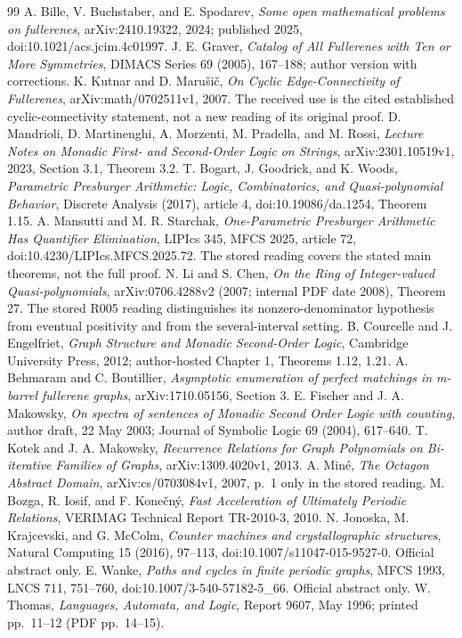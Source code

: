 \documentclass[11pt]{amsart}
\theoremstyle{definition}\newtheorem{definition}{Definition}
\begin{document}
\clearpage
\begin{thebibliography}{99}
 A. Bille, V. Buchstaber, and E. Spodarev,
\emph{Some open mathematical problems on fullerenes}, arXiv:2410.19322,
2024; published 2025, doi:10.1021/acs.jcim.4c01997.
 J. E. Graver,
\emph{Catalog of All Fullerenes with Ten or More Symmetries},
DIMACS Series 69 (2005), 167--188; author version with corrections.
 K. Kutnar and D. Maru\v{s}i\v{c},
\emph{On Cyclic Edge-Connectivity of Fullerenes}, arXiv:math/0702511v1,
2007. The received use is the cited established cyclic-connectivity
statement, not a new reading of its original proof.
 D. Mandrioli, D. Martinenghi, A. Morzenti,
M. Pradella, and M. Rossi,
\emph{Lecture Notes on Monadic First- and Second-Order Logic on Strings},
arXiv:2301.10519v1, 2023, Section 3.1, Theorem 3.2.
 T. Bogart, J. Goodrick, and K. Woods,
\emph{Parametric Presburger Arithmetic: Logic, Combinatorics, and
Quasi-polynomial Behavior}, Discrete Analysis (2017), article 4,
doi:10.19086/da.1254, Theorem 1.15.
 A. Mansutti and M. R. Starchak,
\emph{One-Parametric Presburger Arithmetic Has Quantifier Elimination},
LIPIcs 345, MFCS 2025, article 72, doi:10.4230/LIPIcs.MFCS.2025.72.
The stored reading covers the stated main theorems, not the full proof.
 N. Li and S. Chen,
\emph{On the Ring of Integer-valued Quasi-polynomials},
arXiv:0706.4288v2 (2007; internal PDF date 2008), Theorem 27.
The stored R005 reading distinguishes its nonzero-denominator hypothesis
from eventual positivity and from the several-interval setting.
 B. Courcelle and J. Engelfriet,
\emph{Graph Structure and Monadic Second-Order Logic}, Cambridge
University Press, 2012; author-hosted Chapter 1, Theorems 1.12, 1.21.
 A. Behmaram and C. Boutillier,
\emph{Asymptotic enumeration of perfect matchings in m-barrel fullerene graphs},
arXiv:1710.05156, Section 3.
 E. Fischer and J. A. Makowsky,
\emph{On spectra of sentences of Monadic Second Order Logic with counting},
author draft, 22 May 2003; Journal of Symbolic Logic 69 (2004), 617--640.
 T. Kotek and J. A. Makowsky,
\emph{Recurrence Relations for Graph Polynomials on Bi-iterative
Families of Graphs}, arXiv:1309.4020v1, 2013.
 A. Min\'e, \emph{The Octagon Abstract Domain},
arXiv:cs/0703084v1, 2007, p.~1 only in the stored reading.
 M. Bozga, R. Iosif, and F. Kone\v{c}n\'y,
\emph{Fast Acceleration of Ultimately Periodic Relations},
VERIMAG Technical Report TR-2010-3, 2010.
 N. Jonoska, M. Krajcevski, and G. McColm,
\emph{Counter machines and crystallographic structures},
Natural Computing 15 (2016), 97--113,
doi:10.1007/s11047-015-9527-0. Official abstract only.
 E. Wanke, \emph{Paths and cycles in finite periodic graphs},
MFCS 1993, LNCS 711, 751--760,
doi:10.1007/3-540-57182-5\_66. Official abstract only.
 W. Thomas, \emph{Languages, Automata, and Logic},
Report 9607, May 1996; printed pp.~11--12 (PDF pp.~14--15).
\end{thebibliography}
\end{document}
